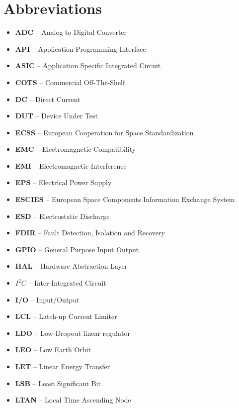 \section{Abbreviations}
\begin{itemize}
    \item    \textbf{ADC}      --    Analog to Digital Converter
    \item    \textbf{API}      --    Application Programming Interface
    \item    \textbf{ASIC}     --    Application Specific Integrated Circuit
    \item    \textbf{COTS}     --    Commercial Off-The-Shelf
    \item    \textbf{DC}       --    Direct Current
    \item    \textbf{DUT}      --    Device Under Test
    \item    \textbf{ECSS}     --    European Cooperation for Space Standardization
    \item    \textbf{EMC}      --    Electromagnetic Compatibility
    \item    \textbf{EMI}      --    Electromagnetic Interference
    \item    \textbf{EPS}      --    Electrical Power Supply
    \item    \textbf{ESCIES}   --    European Space Components Information Exchange System
    \item    \textbf{ESD}      --    Electrostatic Discharge
    \item    \textbf{FDIR}     --    Fault Detection, Isolation and Recovery
    \item    \textbf{GPIO}     --    General Purpose Input Output
    \item    \textbf{HAL}      --    Hardware Abstraction Layer
    \item    \textbf{$I^2C$}   --    Inter-Integrated Circuit
    \item    \textbf{I/O}      --    Input/Output
    \item    \textbf{LCL}      --    Latch-up Current Limiter
    \item    \textbf{LDO}      --    Low-Dropout linear regulator
    \item    \textbf{LEO}      --    Low Earth Orbit
    \item    \textbf{LET}      --    Linear Energy Transfer
    \item    \textbf{LSB}      --    Least Significant Bit
    \item    \textbf{LTAN}     --    Local Time Ascending Node

\end{itemize}
